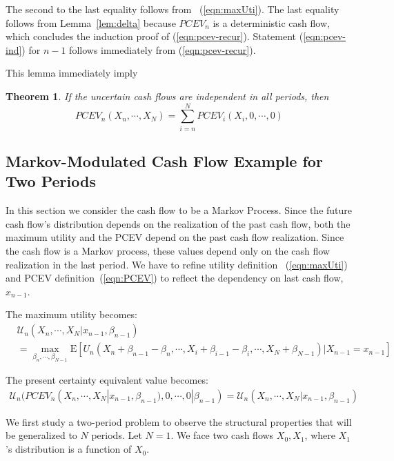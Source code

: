 \documentclass{article}[12pt letter]
\newtheorem{theorem}{Theorem}
\newcommand{\E}{\mathrm{E}}
\begin{document}
The second to the last equality follows from ~(\ref{eqn:maxUti}).
The last equality follows from Lemma~\ref{lem:delta} because $PCEV_n$ is a deterministic cash flow, which concludes the induction proof of (\ref{eqn:pcev-recur}). Statement (\ref{eqn:pcev-ind}) for $n-1$ follows immediately from (\ref{eqn:pcev-recur}).
\endproof


This lemma immediately imply

\begin{theorem} \label{theo:indCash} 
If the uncertain cash flows are independent in all periods, then
\[PCEV_n(X_n, \cdots, X_N)  = \sum_{i=n}^N PCEV_i(X_i,0,\cdots,0)\]
\end{theorem}


\subsection{Markov-Modulated Cash Flow Example for Two Periods}

In this section we consider the cash flow to be a Markov Process. Since the future cash flow's distribution depends on the realization of the past cash flow, both the maximum utility and the PCEV depend on the past cash flow realization. Since the cash flow is a Markov process, these values depend only on the cash flow realization in the last period. We have to refine  utility definition ~(\ref{eqn:maxUti}) and PCEV definition~(\ref{eqn:PCEV}) to reflect the dependency on last cash flow, $x_{n-1}$.

The maximum utility becomes:
\begin{align} \label{eqn:maxUtiMK}
    &\mathcal{U}_n(X_n,\cdots, X_{N}|x_{n-1},\beta_{n-1}) \nonumber \\
    & = \max_{\beta_n, \cdots, \beta_{N-1}} \E [U_n(X_n+\beta_{n-1}-\beta_n, \cdots, X_i + \beta_{i-1}-\beta_i, \cdots, X_N + \beta_{N-1})|X_{n-1}=x_{n-1} ]
\end{align}

The present certainty equivalent value becomes:
\begin{align} \label{eqn:PCEVMK}
    \mathcal{U}_n(PCEV_n(X_n, \cdots, X_N|x_{n-1},\beta_{n-1}), 0,\cdots,0|\beta_{n-1})=\mathcal{U}_n(X_n,\cdots, X_{N}|x_{n-1},\beta_{n-1})
\end{align}


We first study a two-period problem to observe the structural properties that will be generalized to $N$ periods. Let $N=1$. We face two cash flows $X_0, X_1$, where $X_1$'s distribution is a function of $X_0$.
\end{document}
